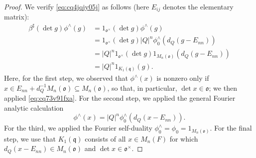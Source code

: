 \documentclass[reqno]{amsart}
\theoremstyle{plain}
\theoremstyle{definition}
\begin{document}
\begin{proof}
  We verify \eqref{eq:cq4jqjy05j} as follows (here $E_{ij}$ denotes the elementary matrix):
  \begin{align*}
    \beta^\sharp(\det g) \phi^\wedge(g)
    &=
      1_{\mathfrak{o}^\times}(\det g) \phi^\wedge(g)\\
    &=
      1_{\mathfrak{o}^\times}(\det g)
      \lvert Q \rvert^n \phi_0^\wedge(d_{Q}(g - E_{nn})) \\
    &=
      \lvert Q \rvert^n
      1_{\mathfrak{o}^\times}(\det g)
      1_{M_n(\mathfrak{o})}(d_{Q}(g - E_{nn})) \\
    &=
      \lvert Q \rvert^n
      1_{K_1(\mathfrak{q})}(g).
  \end{align*}
  Here, for the first step, we observed that $\phi^\wedge(x)$ is nonzero only if $x \in E_{nn} + d_Q^{-1} M_n(\mathfrak{o}) \subseteq M_n(\mathfrak{o})$, so that, in particular, $\det x \in \mathfrak{o}$; we then applied \eqref{eq:cq73v91fxa}.  For the second step, we applied the general Fourier analytic calculation
  \begin{equation}\label{eq:cq4jqkb0q8}
    \phi^\wedge(x) = \lvert Q \rvert^n \phi_0^\wedge(d_{Q}(x - E_{nn})).
  \end{equation}
  For the third, we applied the Fourier self-duality $\phi_0^\wedge = \phi_0 = 1_{M_n(\mathfrak{o})}$.  For the final step, we use that $K_1(\mathfrak{q})$ consists of all $x \in M_n(F)$ for which $d_Q (x - E_{nn}) \in M_n(\mathfrak{o})$ and $\det x \in \mathfrak{o}^\times$.
\end{proof}
\end{document}
